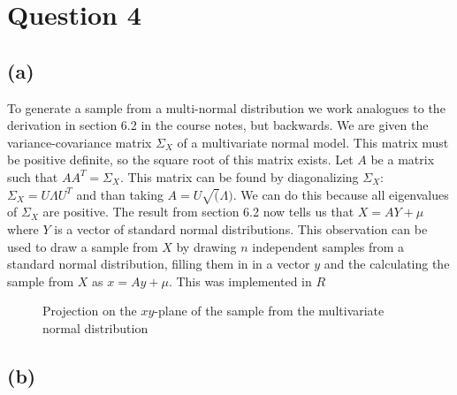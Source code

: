 \documentclass[a4paper]{article}
\begin{document}
\section*{Question 4}
\noindent {}

\subsection*{(a)}
\noindent {}

To generate a sample from a multi-normal distribution we work analogues to the derivation in section 6.2 in the course notes, but backwards. We are given the variance-covariance matrix $\Sigma_X$ of a multivariate normal model. This matrix must be positive definite, so the square root of this matrix exists. 
Let $A$ be a matrix such that $AA^T=\Sigma_X$. This matrix can be found by diagonalizing $\Sigma_X$: $\Sigma_X=U\Lambda U^T$ and than taking $A = U \sqrt(\Lambda)$. We can do this because all eigenvalues of $\Sigma_X$ are positive.
The result from section 6.2 now tells us that $X = AY + \mu$ where $Y$ is a vector of standard normal distributions.
This observation can be used to draw a sample from $X$ by drawing $n$ independent samples from a standard normal distribution, filling them in in a vector $y$ and the calculating the sample from $X$ as $x=Ay+\mu$. This was implemented in $R$

\begin{figure}
	\centering
	
	\caption{Projection on the $xy$-plane of the sample from the multivariate normal distribution}
	\label{fig:sample}
\end{figure}

\subsection*{(b)}
\noindent {}
\end{document}
